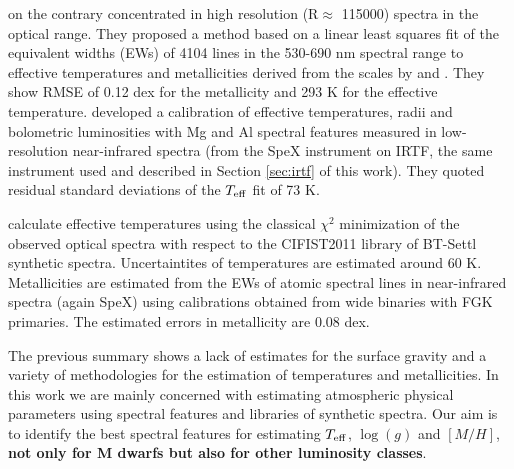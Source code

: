 \cite{2014A&A...568A.121N} on the contrary concentrated in
high resolution (R$\approx$ 115000) spectra in the optical range.
They proposed a method based on a linear least squares fit of the
equivalent widths (EWs) of 4104 lines in the 530-690 nm spectral range
to effective temperatures and metallicities derived from the scales
by \cite{2012A&A...538A..25N} and \cite{2008MNRAS.389..585C}.  They
show RMSE of 0.12 dex for the metallicity and 293 K for the effective
temperature. \cite{2015ApJ...800...85N} developed a calibration of
effective temperatures, radii and bolometric luminosities with Mg and
Al spectral features measured in low-resolution near-infrared spectra
(from the SpeX instrument on IRTF, the same instrument used and
described in Section \ref{sec:irtf} of this work).  They quoted 
residual standard deviations of the $T_{\rm eff}$ fit of 73
K.

\cite{Mann2015} calculate effective temperatures using the
classical $\chi^2$ minimization of the observed optical spectra with
respect to the CIFIST2011 library of BT-Settl synthetic spectra.
Uncertaintites of temperatures are estimated around 60 K.
Metallicities are estimated from the EWs of atomic spectral lines in
near-infrared spectra (again SpeX) using calibrations obtained from
wide binaries with FGK primaries. The estimated errors in metallicity
are 0.08 dex.

The previous summary shows a lack of estimates for the surface gravity
and a variety of methodologies for the estimation of temperatures and
metallicities. In this work we are mainly concerned with estimating
atmospheric physical parameters using spectral features and libraries
of synthetic spectra. Our aim is to identify the best spectral
features for estimating $T_{\rm eff}$, $\log(g)$ and $[M/H]$, {\bf not
only for M dwarfs but also for other luminosity classes}.

